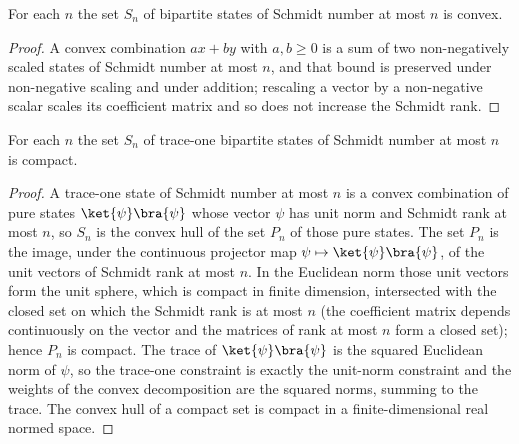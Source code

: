 \begin{theorem}
    \label{thm:convex_setOf_has_schmidt_number_le}
    \leanok
    For each $n$ the set $S_n$ of bipartite states of Schmidt number at most $n$ is
    convex.
\end{theorem}

\begin{proof}
    \leanok
    A convex combination $a x + b y$ with $a,b\ge 0$ is a sum of two non-negatively
    scaled states of Schmidt number at most $n$, and that bound is preserved under
    non-negative scaling and under addition; rescaling a vector by a non-negative
    scalar scales its coefficient matrix and so does not increase the Schmidt rank.
\end{proof}

\begin{theorem}
    \label{thm:compact_setOf_has_schmidt_number_le_trace_one}
    \leanok
    For each $n$ the set $S_n$ of trace-one bipartite states of Schmidt number at most
    $n$ is compact.
\end{theorem}

\begin{proof}
    \leanok
    A trace-one state of Schmidt number at most $n$ is a convex combination of pure
    states $\ket{\psi}\bra{\psi}$ whose vector $\psi$ has unit norm and Schmidt rank
    at most $n$, so $S_n$ is the convex hull of the set $P_n$ of those pure states.
    The set $P_n$ is the image, under the continuous projector map
    $\psi\mapsto\ket{\psi}\bra{\psi}$, of the unit vectors of Schmidt rank at most
    $n$. In the Euclidean norm those unit vectors form the unit sphere, which is
    compact in finite dimension, intersected with the closed set on which the Schmidt
    rank is at most $n$ (the coefficient matrix depends continuously on the vector and
    the matrices of rank at most $n$ form a closed set); hence $P_n$ is compact. The
    trace of $\ket{\psi}\bra{\psi}$ is the squared Euclidean norm of $\psi$, so the
    trace-one constraint is exactly the unit-norm constraint and the weights of the
    convex decomposition are the squared norms, summing to the trace. The convex hull
    of a compact set is compact in a finite-dimensional real normed space.
\end{proof}

